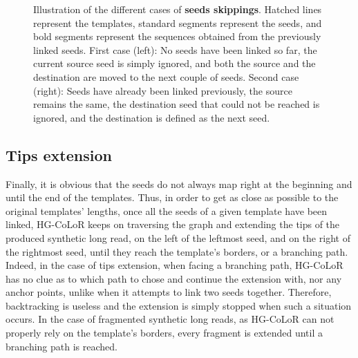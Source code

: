\documentclass[long, final]{jobim2017}
\begin{document}
\begin{figure}
\begin{center}
{
	}
\end{center}
\caption{Illustration of the different cases of \textbf{seeds skippings}. Hatched lines represent the templates, standard segments represent
the seeds, and bold segments represent the sequences obtained from the previously linked seeds. First case (left): No seeds have been linked so far, the current source seed is simply ignored, and both the source and the destination are moved to the next couple of seeds. Second case (right): Seeds have already been linked previously, the source remains the same, the destination seed that could not be reached is ignored, and the destination is defined as the next seed. \label{SeedSkipping}}
\end{figure}

\subsection{Tips extension}

Finally, it is obvious that the seeds do not always map right at the beginning and until the end of the templates. Thus, in order to get as close as possible to the original templates' lengths, once all the seeds of a given template have been linked, HG-CoLoR keeps on traversing the graph and extending the tips of the produced synthetic long read, on the left of the leftmost seed, and on the right of the rightmost seed, until they reach the template's borders, or a branching path. Indeed, in the case of tips extension, when facing a branching path, HG-CoLoR has no clue as to which path to chose and continue the extension with, nor any anchor points, unlike when it attempts to link two seeds together. Therefore, backtracking is useless and the extension is simply stopped when such a situation occurs. In the case of fragmented synthetic long reads, as HG-CoLoR can not properly rely on the template's borders, every fragment is extended until a branching path is reached.
\end{document}
